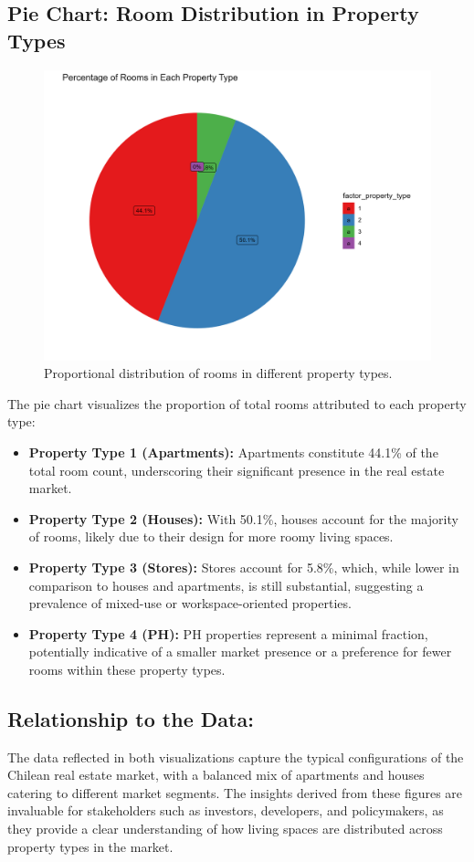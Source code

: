 \documentclass{article}
\begin{document}
\subsection{Pie Chart: Room Distribution in Property Types}
\begin{figure}[H]
\centering
\includegraphics[width=\textwidth]{PS6d_Olubayode.png}
\caption{Proportional distribution of rooms in different property types.}
\end{figure}

The pie chart visualizes the proportion of total rooms attributed to each property type:
\begin{itemize}
\item \textbf{Property Type 1 (Apartments):} Apartments constitute 44.1\% of the total room count, underscoring their significant presence in the real estate market.
\item \textbf{Property Type 2 (Houses):} With 50.1\%, houses account for the majority of rooms, likely due to their design for more roomy living spaces.
\item \textbf{Property Type 3 (Stores):} Stores account for 5.8\%, which, while lower in comparison to houses and apartments, is still substantial, suggesting a prevalence of mixed-use or workspace-oriented properties.
\item \textbf{Property Type 4 (PH):} PH properties represent a minimal fraction, potentially indicative of a smaller market presence or a preference for fewer rooms within these property types.
\end{itemize}

\subsection{Relationship to the Data:}
The data reflected in both visualizations capture the typical configurations of the Chilean real estate market, with a balanced mix of apartments and houses catering to different market segments. The insights derived from these figures are invaluable for stakeholders such as investors, developers, and policymakers, as they provide a clear understanding of how living spaces are distributed across property types in the market.
\end{document}
